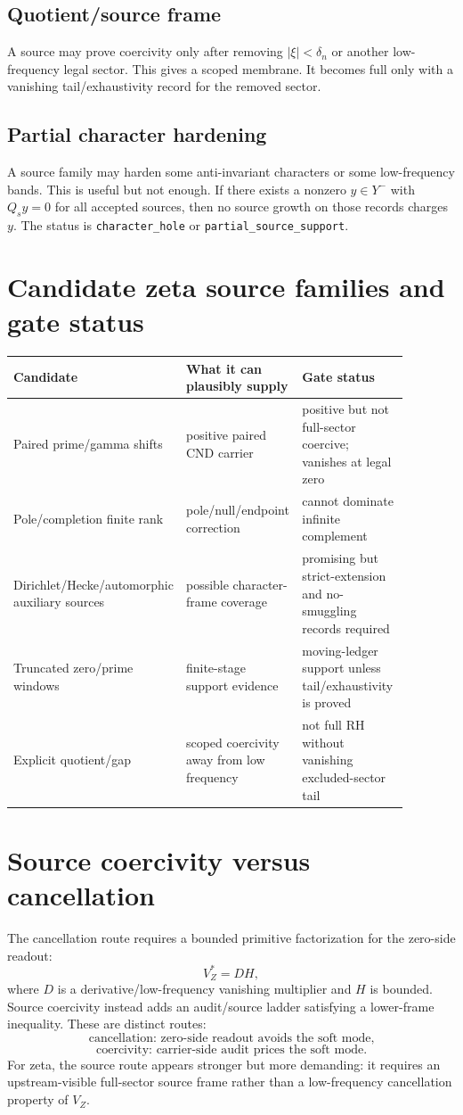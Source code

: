 \documentclass[11pt]{article}
\begin{document}
\subsection{Quotient/source frame}
A source may prove coercivity only after removing \(|\xi|<\delta_n\) or another low-frequency legal sector.  This gives a scoped membrane.  It becomes full only with a vanishing tail/exhaustivity record for the removed sector.

\subsection{Partial character hardening}
A source family may harden some anti-invariant characters or some low-frequency bands.  This is useful but not enough.  If there exists a nonzero \(y\in Y^-\) with \(Q_sy=0\) for all accepted sources, then no source growth on those records charges \(y\).  The status is \texttt{character\_hole} or \texttt{partial\_source\_support}.

\section{Candidate zeta source families and gate status}
\begin{center}
\begin{tabular}{p{0.26\linewidth}p{0.30\linewidth}p{0.32\linewidth}}
\hline
Candidate & What it can plausibly supply & Gate status \\
\hline
Paired prime/gamma shifts & positive paired CND carrier & positive but not full-sector coercive; vanishes at legal zero \\
Pole/completion finite rank & pole/null/endpoint correction & cannot dominate infinite complement \\
Dirichlet/Hecke/automorphic auxiliary sources & possible character-frame coverage & promising but strict-extension and no-smuggling records required \\
Truncated zero/prime windows & finite-stage support evidence & moving-ledger support unless tail/exhaustivity is proved \\
Explicit quotient/gap & scoped coercivity away from low frequency & not full RH without vanishing excluded-sector tail \\
\hline
\end{tabular}
\end{center}

\section{Source coercivity versus cancellation}
The cancellation route requires a bounded primitive factorization for the zero-side readout:
\[
V_Z^*=D H,
\]
where \(D\) is a derivative/low-frequency vanishing multiplier and \(H\) is bounded.  Source coercivity instead adds an audit/source ladder satisfying a lower-frame inequality.  These are distinct routes:
\[
\text{cancellation: zero-side readout avoids the soft mode,}
\]
\[
\text{coercivity: carrier-side audit prices the soft mode.}
\]
For zeta, the source route appears stronger but more demanding: it requires an upstream-visible full-sector source frame rather than a low-frequency cancellation property of \(V_Z\).
\end{document}
